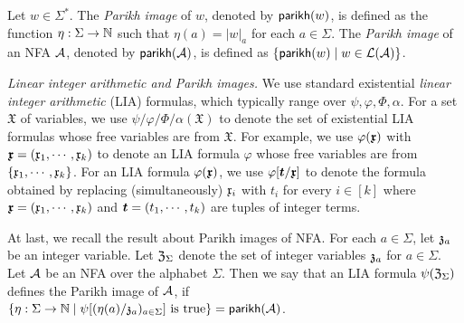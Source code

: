 Let $w \in \Sigma^*$. The \emph{Parikh image} of $w$, denoted by $\mathsf{parikh}(w)$, is defined as the function $\eta: \Sigma \rightarrow \mathbb{N}$ such that $\eta(a) = |w|_a$ for each $a \in \Sigma$. The \emph{Parikh image} of an NFA $\mathcal{A}$, denoted by $\mathsf{parikh}(\mathcal{A})$, is defined as $\{\mathsf{parikh}(w) \mid w \in \mathcal{L}(\mathcal{A})\}$.






\medskip
\noindent 
\emph{Linear integer arithmetic and Parikh images.}
We use standard existential \emph{linear integer arithmetic} (LIA) formulas, which
 typically range over $\psi, \varphi, \Phi, \alpha$. 
For a set $\mathfrak{X}$ of variables, we use $\psi/\varphi/\Phi/\alpha(\mathfrak{X})$ to denote the set of existential LIA formulas whose free variables are from $\mathfrak{X}$. 
For example, we use $\varphi(\vec{\anivar})$ with $\myvec{\anivar} = (\anivar_1, \cdots, \anivar_k)$ to denote an LIA formula $\varphi$ whose free variables are from $\{\mathfrak{x}_1, \cdots, \mathfrak{x}_k\}$. For an LIA formula $\varphi(\vec{\anivar})$, we use $\varphi[\myvec{t}/\myvec{\anivar}]$ to denote the formula obtained by replacing (simultaneously) $\mathfrak{x}_i$ with $t_i$ for every $i \in [k]$ where $\myvec{\anivar} = (\anivar_1, \cdots, \anivar_k)$ and $\myvec{t} = (t_1, \cdots, t_k)$ are tuples of integer terms.

At last, we recall the result about Parikh images of NFA. 
For each $a \in \Sigma$, let $\mathfrak{z}_a$ be an integer variable. Let $\mathfrak{Z}_\Sigma$ denote the set of integer variables $\mathfrak{z}_a$ for $a \in \Sigma$. 
Let $\mathcal{A}$ be an NFA over the alphabet $\Sigma$. Then 
we say that an LIA formula $\psi(\mathfrak{Z}_\Sigma)$ defines the Parikh image of $\mathcal{A}$, if $\{\eta: \Sigma \rightarrow \mathbb{N} \mid \psi[(\eta(a) /\mathfrak{z}_a)_{a \in \Sigma}] \mbox{ is true}\} = \mathsf{parikh}(\mathcal{A})$. 

